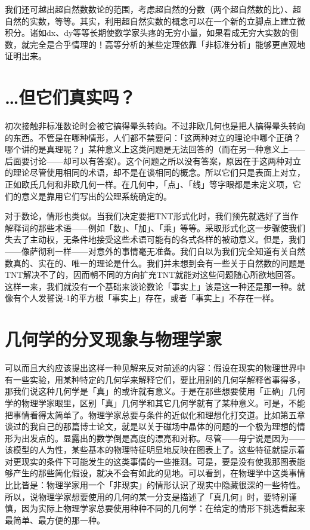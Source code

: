 \documentclass[
  12pt,
  twoside,
  openright,
  oldfontcommands,
]{memoir}
\begin{document}
我们还可越出超自然数数论的范围，考虑超自然的分数（两个超自然数的比）、超自然的实数，等等。其实，利用超自然实数的概念可以在一个新的立脚点上建立微积分。诸如dx、dy等等长期使数学家头疼的无穷小量，如果看成无穷大实数的倒数，就完全是合乎情理的！高等分析的某些定理依靠「非标准分析」能够更直观地证明出来。

\section{\ldots 但它们真实吗？}

初次接触非标准数论时会被它搞得晕头转向。不过非欧几何也是把人搞得晕头转向的东西。不管是在哪种情形，人们都不禁要问：「这两种对立的理论中哪个正确？哪个讲的是真理呢？」某种意义上这类问题是无法回答的（而在另一种意义上------后面要讨论------却可以有答案）。这个问题之所以没有答案，原因在于这两种对立的理论尽管使用相同的术语，却不是在谈相同的概念。所以它们只是表面上对立，正如欧氏几何和非欧几何一样。在几何中，「点」、「线」等字眼都是未定义项，它们的意义是靠用它们写出的公理系统确定的。

对于数论，情形也类似。当我们决定要把TNT形式化时，我们预先就选好了当作解释词的那些术语------例如「数」、「加」、「乘」等等。采取形式化这一步骤使我们失去了主动权，无条件地接受这些术语可能有的各式各样的被动意义。但是，我们------像萨彻利一样------对意外的事情毫无准备。我们自以为我们完全知道有关自然数真的、实在的、唯一的理论是什么。我们并未想到会有一些关于自然数的问题是TNT解决不了的，因而朝不同的方向扩充TNT就能对这些问题随心所欲地回答。这样一来，我们就没有一个基础来谈论数论「事实上」该是这一种还是那一种。就像有个人发誓说-1的平方根「事实上」存在，或者「事实上」不存在一样。

\section{几何学的分叉现象与物理学家}

可以而且大约应该提出这样一种见解来反对前述的内容：假设在现实的物理世界中有一些实验，用某种特定的几何学来解释它们，要比用别的几何学解释省事得多，那我们说这种几何学是「真」的或许就有意义。于是在那些想要使用「正确」几何学的物理学家眼里，区别「真」几何学和其它几何学就有了某种意义。可是，不能把事情看得太简单了。物理学家总要与条件的近似化和理想化打交道。比如第五章谈过的我自己的那篇博士论文，就是以关于磁场中晶体的问题的一个极为理想的情形为出发点的。显露出的数学倒是高度的漂亮和对称。尽管------毋宁说是因为------该模型的人为性，某些基本的物理特征明显地反映在图表上了。这些特征就提示着对更现实的条件下可能发生的这类事情的一些推测。可是，要是没有使我那图表能够产生的那些简化假设，就决不会有如此的见地。可以看到，在物理学中这类事情比比皆是：物理学家用一个「非现实」的情形认识了现实中隐藏很深的一些特性。所以，说物理学家想要使用的几何的某一分支是描述了「真几何」时，要特别谨慎，因为实际上物理学家总要使用种种不同的几何学：在给定的情形下挑选看起来最简单、最方便的那一种。
\end{document}
